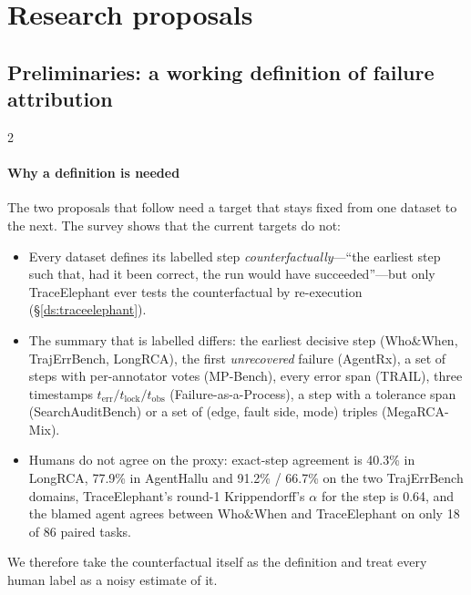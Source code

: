 \section{Research proposals}\label{sec:future}

\subsection{Preliminaries: a working definition of failure attribution}\label{sec:future:prelim}

\begin{multicols}{2}
\paragraph{Why a definition is needed} The two proposals that follow need a target that stays fixed from one dataset to the next. The survey shows that the current targets do not:
\begin{itemize}[leftmargin=1.1em]
\item Every dataset defines its labelled step \emph{counterfactually}---``the earliest step such that, had it been correct, the run would have succeeded''---but only TraceElephant ever tests the counterfactual by re-execution (\S\ref{ds:traceelephant}).
\item The summary that is labelled differs: the earliest decisive step (Who\&When, TrajErrBench, LongRCA), the first \emph{unrecovered} failure (AgentRx), a set of steps with per-annotator votes (MP-Bench), every error span (TRAIL), three timestamps $t_{\mathrm{err}}/t_{\mathrm{lock}}/t_{\mathrm{obs}}$ (Failure-as-a-Process), a step with a tolerance span (SearchAuditBench) or a set of (edge, fault side, mode) triples (MegaRCA-Mix).
\item Humans do not agree on the proxy: exact-step agreement is 40.3\% in LongRCA, 77.9\% in AgentHallu and 91.2\% / 66.7\% on the two TrajErrBench domains, TraceElephant's round-1 Krippendorff's $\alpha$ for the step is 0.64, and the blamed agent agrees between Who\&When and TraceElephant on only 18 of 86 paired tasks.
\end{itemize}
We therefore take the counterfactual itself as the definition and treat every human label as a noisy estimate of it.


\end{multicols}
